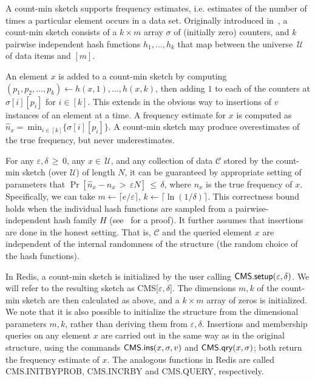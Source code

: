 A count-min sketch supports frequency estimates, i.e. estimates of the number of times a particular element occurs in a data set. Originally introduced in~\cite{cormode2005improved}, a count-min sketch consists of a $k \times m$ array $\sigma$ of (initially zero) counters, and $k$ pairwise independent hash functions $h_1, ..., h_k$ that map between the universe~$\mathcal{U}$ of data items and $[m]$.

An element $x$ is added to a count-min sketch by computing 
$(p_1,p_2,\ldots,p_k) \gets h(x,1),\ldots,h(x,k)$, 
 then adding $1$ to each of the counters at $\sigma[i][p_i]$ for $i \in [k]$. This extends in the obvious way to insertions of $v$ instances of an element at a time. 
A frequency estimate for $x$ is computed as $\hat{n}_x = \ \mathrm{min}_{i \in [k]} \{\sigma[i][p_i]\}$. A count-min sketch may produce overestimates of the true frequency, but never underestimates.

For any $\varepsilon,\delta \, {\geq}\, 0$, any $x {\in}\, \mathcal{U}$, and any collection of data $\mathcal{C}$ stored by the count-min sketch (over $\mathcal{U}$) of length $N$, it can be guaranteed by appropriate setting of parameters that $\Pr[\hat{n}_x - n_x \,{>}\, \varepsilon N] \,{\leq}\, \delta$, where $n_x$ is the true frequency of $x$. Specifically, we can take $m \gets \lceil{ e/\varepsilon \rceil}$, $k \gets \lceil{ \ln{(1/\delta)} \rceil}$. This correctness bound holds when the individual hash functions are sampled from a pairwise-independent hash family $H$ (see~\cite{cormode2005improved} for a proof). It further assumes that insertions are done in the honest setting. That is, $\mathcal{C}$ and the queried element $x$ are independent of the internal randomness of the structure (the random choice of the hash functions). 


In Redis, a count-min sketch is initialized by the user calling $\textsf{CMS}.\textsf{setup}(\varepsilon, \delta)$. We will refer to the resulting sketch as CMS[$\varepsilon, \delta$]. The dimensions $m, k$ of the count-min sketch are then calculated as above, and a $k \times m$ array of zeros is initialized. We note that it is also possible to initialize the structure from the dimensional parameters $m, k$, rather than deriving them from $\varepsilon, \delta$. Insertions and membership queries on any element $x$ are carried out in the same way as in the original structure, using the commands $\textsf{CMS}.\textsf{ins}(x, \sigma, v)$ and $\textsf{CMS}.\textsf{qry}(x, \sigma)$; both return the frequency estimate of $x$.
The analogous functions in Redis are called \textsf{CMS.INITBYPROB}, \textsf{CMS.INCRBY} and \textsf{CMS.QUERY}, respectively. 

